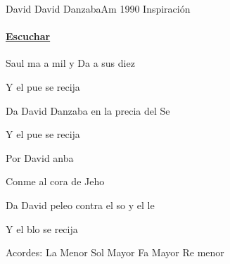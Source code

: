 \documentclass[12pt, spanish]{book}
\newcommand{\NotCCLIed}{\relax}
\begin{document}
    \begin{song}{David David Danzaba}{Am}
    {1990} %
    {Inspiración}
    {} %
    {} %
        \ifChordBk
            \paragraph{\mbox{}\hfill\protect\href{https://open.spotify.com/intl-es/track/4ZgBEC9baFPWZwZIUkP7DR}{Escuchar}\mbox{}\hfill}
        \fi

        \begin{SBOpGroup}
            Saul ma a mil y Da a sus diez 

            Y el pue se recija
        \end{SBOpGroup}

        \begin{SBOpGroup}
            Da David Danzaba en la precia del Se


            Y el pue se recija
        \end{SBOpGroup}


        \begin{SBChorus}
            Por David anba


            Conme al cora de Jeho
        \end{SBChorus}

        \begin{SBOpGroup}
            Da David peleo contra el so y el le


            Y el blo se recija
        \end{SBOpGroup}

        \ifChordBk
        \begin{SBOpGroup}
            Acordes:\break
            \upchord{\Am}\qquad La Menor \hfill
            \upchord{\G}\qquad Sol Mayor \hfill\null\break
            \upchord{\F}\qquad Fa Mayor \hfill
            \upchord{\Dm}Re menor \hfill\null\break
        \end{SBOpGroup}
        \fi
    \end{song}
\end{document}
